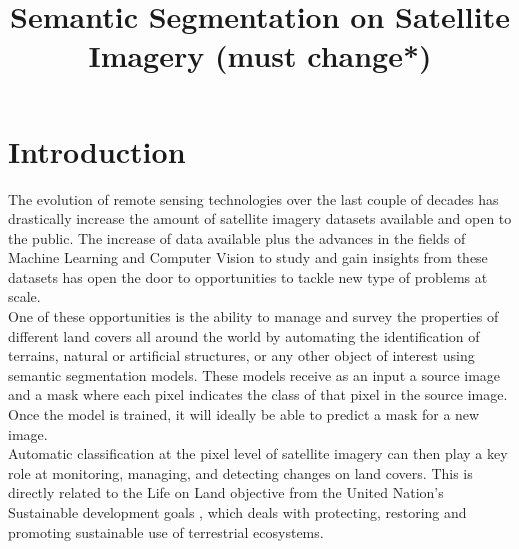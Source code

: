 \documentclass[conference]{IEEEtran}
\begin{document}
\title{Semantic Segmentation on Satellite Imagery (must change*)\\}
\author{
\and
{}
\and
{}
}
\maketitle


\section{Introduction}
The evolution of remote sensing technologies over the last couple of decades has drastically increase the amount of satellite imagery datasets available and open to the public. The increase of data available plus the advances in the fields of Machine Learning and Computer Vision to study and gain insights from these datasets has open the door to opportunities to tackle new type of problems at scale. \\ \indent
One of these opportunities is the ability to manage and survey the properties of different land covers all around the world by automating the identification of terrains, natural or artificial structures, or any other object of interest using semantic segmentation models. These models receive as an input a source image and a mask where each pixel indicates the class of that pixel in the source image. Once the model is trained, it will ideally be able to predict a mask for a new image.  \\ \indent
Automatic classification at the pixel level of satellite imagery can then play a key role at monitoring, managing, and detecting changes on land covers. This is directly related to the Life on Land objective from the United Nation's Sustainable development goals  \cite{united_nations}, which deals with protecting, restoring and promoting sustainable use of terrestrial ecosystems. 
\end{document}
